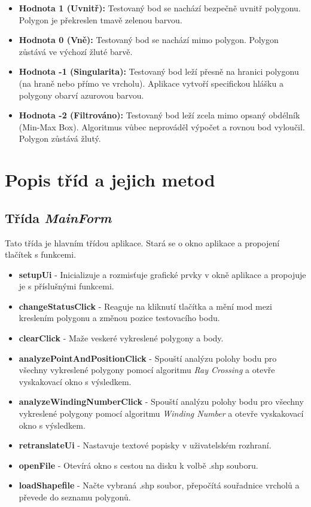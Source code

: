 \documentclass[12pt, a4paper]{article}
\begin{document}
\begin{itemize}
    \item \textbf{Hodnota 1 (Uvnitř):} Testovaný bod se nachází bezpečně uvnitř polygonu. Polygon je překreslen tmavě zelenou barvou.
    \item \textbf{Hodnota 0 (Vně):} Testovaný bod se nachází mimo polygon. Polygon zůstává ve výchozí žluté barvě.
    \item \textbf{Hodnota -1 (Singularita):} Testovaný bod leží přesně na hranici polygonu (na hraně nebo přímo ve vrcholu). Aplikace vytvoří specifickou hlášku a polygony obarví azurovou barvou.
    \item \textbf{Hodnota -2 (Filtrováno):} Testovaný bod leží zcela mimo opsaný obdélník (Min-Max Box). Algoritmus vůbec neprováděl výpočet a rovnou bod vyloučil. Polygon zůstává žlutý.
\end{itemize}


\section{Popis tříd a jejich metod}
\subsection{Třída \textit{MainForm}}
Tato třída je hlavním třídou aplikace. Stará se o okno aplikace a propojení tlačítek s funkcemi.

\begin{itemize}
  \item \textbf{setupUi} - Inicializuje a rozmisťuje grafické prvky v okně aplikace a propojuje je s příslušnými funkcemi.
  \item \textbf{changeStatusClick} - Reaguje na kliknutí tlačítka a mění mod mezi kreslením polygonu a změnou pozice testovacího bodu.
  \item \textbf{clearClick} - Maže veskeré vykreslené polygony a body.
  \item \textbf{analyzePointAndPositionClick} - Spouští analýzu polohy bodu pro všechny vykreslené polygony pomocí algoritmu \textit{Ray Crossing} a otevře vyskakovací okno s výsledkem.
  \item \textbf{analyzeWindingNumberClick} - Spouští analýzu polohy bodu pro všechny vykreslené polygony pomocí algoritmu \textit{Winding Number} a otevře vyskakovací okno s výsledkem.
  \item \textbf{retranslateUi} - Nastavuje textové popisky v uživatelském rozhraní.
  \item \textbf{openFile} - Otevírá okno s cestou na disku k volbě .shp souboru.
  \item \textbf{loadShapefile} - Načte vybraná .shp soubor, přepočítá souřadnice vrcholů a převede do seznamu polygonů.
\end{itemize}
\end{document}
